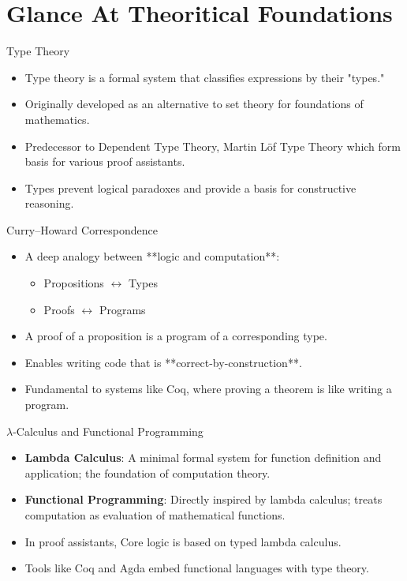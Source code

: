 \documentclass{beamer}
\begin{document}
\section{Glance At Theoritical Foundations}
\begin{frame}{Type Theory}
\begin{itemize}
  \item Type theory is a formal system that classifies expressions by their "types."
  \item Originally developed as an alternative to set theory for foundations of mathematics.
  \item Predecessor to Dependent Type Theory, Martin Löf Type Theory which form basis for various proof assistants.
  \item Types prevent logical paradoxes and provide a basis for constructive reasoning.
\end{itemize}
\end{frame}
\begin{frame}{Curry–Howard Correspondence}
\begin{itemize}
  \item A deep analogy between **logic and computation**:
  \begin{itemize}
    \item Propositions $\leftrightarrow$ Types
    \item Proofs $\leftrightarrow$ Programs
  \end{itemize}
  \item A proof of a proposition is a program of a corresponding type.
  \item Enables writing code that is **correct-by-construction**.
  \item Fundamental to systems like Coq, where proving a theorem is like writing a program.
\end{itemize}
\end{frame}
\begin{frame}{$\lambda$-Calculus and Functional Programming}
    \begin{itemize}
        \item \textbf{Lambda Calculus}: A minimal formal system for function definition and application; the foundation of computation theory.
  \item \textbf{Functional Programming}: Directly inspired by lambda calculus; treats computation as evaluation of mathematical functions.

  \item In proof assistants, Core logic is based on typed lambda calculus.
      \item Tools like Coq and Agda embed functional languages with type theory.
    \end{itemize}
\end{frame}
\end{document}
